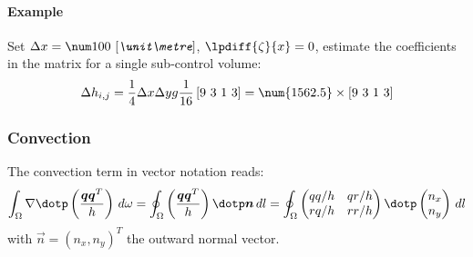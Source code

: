 \paragraph*{Example}
Set $\Delta x = \bqty{100}{\metre}$, $\lpdiff{\zeta}{x}=0$, estimate the coefficients in the matrix for a single sub-control volume:
\begin{align}
    \Delta h_{i,j} = \quart \Dx\Dy g \frac{1}{16} \left[ 9\ 3\ 1\ 3  \right] = \num{1562.5} \times  \left[ 9\ 3\ 1\ 3  \right]
\end{align}
\subsubsection{Convection}
The convection term in vector notation reads:
\begin{align}
    \int_\Omega \nabla \dotp \left( \frac{\vec{q}\vec{q}^T}{h} \right)\, d\omega =
    \oint_{\Omega}  \left( \frac{\vec{q}\vec{q}^T}{h} \right) \dotp \vec{n} \, dl =
    \oint_{\Omega}
    \begin{pmatrix}
        qq/h & qr/h \\
        rq/h & rr/h
    \end{pmatrix}
    \dotp
    \begin{pmatrix}
        n_x \\
        n_y
    \end{pmatrix}
     \, dl
\end{align}
with $\vec{n} = (n_x, n_y)^T$ the outward normal vector.

